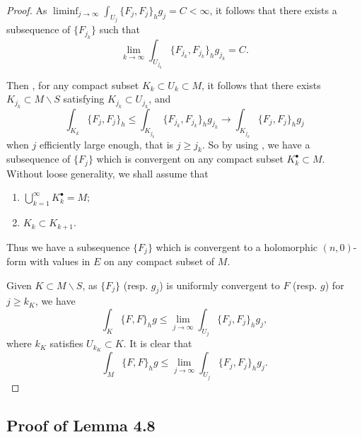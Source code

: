 \begin{proof}
  As $\displaystyle\liminf_{j\to\infty}\int_{U_j}\{F_j,F_j\}_h g_j=C<\infty$, it follows that there exists a subsequence of $\{F_{j_k}\}$ such that \[\lim_{k\to\infty}\int_{U_{j_k}}\{F_{j_k},F_{j_k}\}_h g_{j_k}=C.\]

  Then , for any compact subset $K_k\subset U_k\subset M$, it follows that there exists $K_{j_k}\subset M\backslash S$ satisfying $K_{j_k}\subset U_{j_k}$, and 
  \[
    \int_{K_k}\{F_j,F_j\}_h \leqslant \int_{K_{j_k}} \{F_{j_k},F_{j_k}\}_h g_{j_k} \to \int_{K_{j_k}} \{F_{j},F_{j}\}_h g_{j} 
  \]
  when $j$ efficiently large enough, that is $j\geqslant j_k$. So by using , we have a subsequence of $\{F_j\}$ which is convergent on any compact subset $K^\bullet_k \subset M$. Without loose generality, we shall assume that 
  \begin{enumerate}
    \item $\bigcup_{k=1}^\infty K_k^\bullet=M$;
    \item $K_k\subset K_{k+1}$.
  \end{enumerate}
Thus we have a subsequence $\{F_j\}$ which is convergent to a holomorphic $(n,0)$-form with values in $E$ on any compact subset of $M$.

Given $K\subset M\backslash S$, as $\{F_j\}$ (resp. $g_j$) is uniformly convergent to $F$ (resp. $g$) for $j\geqslant k_K$, we have 
\[
  \int_K \{F,F\}_h g\leqslant \lim_{j\to\infty} \int_{U_j} \{F_j,F_j\}_h g_j, 
\]
where $k_K$ satisfies $U_{k_K}\subset K$. It is clear that 
\[
  \int_M \{F,F\}_h g\leqslant \lim_{j\to\infty} \int_{U_j} \{F_j,F_j\}_h g_j.
\]

\end{proof}
  
\subsection{Proof of Lemma 4.8}


